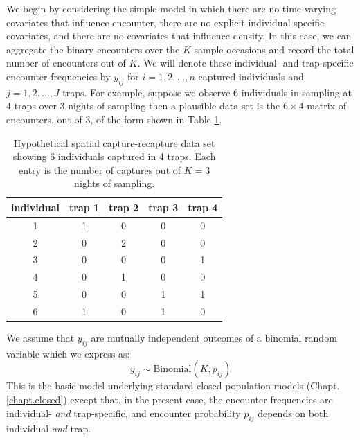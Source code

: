 We begin by considering the simple model in which there are
no time-varying covariates that influence encounter, there are no
explicit individual-specific covariates, and there are no covariates
that influence density. In this case, we can aggregate the binary
encounters over the $K$ sample occasions and record the total number
of encounters out of $K$. We will denote these individual- and
trap-specific encounter frequencies by $y_{ij}$ for $i=1,2,\ldots,n$
captured individuals and $j=1,2,\ldots,J$ traps.  For example, suppose
we observe 6 individuals in sampling at 4 traps over 3 nights of
sampling then a plausible data set is the $6 \times 4$ matrix of
encounters, out of 3, of the form shown in Table \ref{scr0.tab.data}.
\begin{table}
\centering
\caption{Hypothetical spatial capture-recapture data set showing 6
  individuals captured in 4 traps.
Each entry is the number of captures out of
 $K=3$ nights of sampling.
}
\begin{tabular}{ccccc}
\hline \hline
individual &  trap 1 & trap 2 & trap 3 & trap 4 \\ \hline 
1  &   1  &   0  &   0  &   0 \\
2  &   0  &   2  &   0  &   0 \\
3  &   0  &   0  &   0  &   1 \\
4  &   0  &   1  &   0  &   0 \\
5  &   0  &   0  &   1  &   1 \\
6  &   1  &   0  &   1  &   0 \\ \hline
\end{tabular}
\label{scr0.tab.data}
\end{table}
We assume that $y_{ij}$ are
 mutually independent outcomes of a binomial random variable which we
 express as:
\begin{equation}
	y_{ij} \sim \mbox{Binomial}(K, p_{ij})
\label{scr0.eq.bin}
\end{equation}
This is the basic model underlying standard closed population models
(Chapt. \ref{chapt.closed}) except that, in the present case, the
encounter frequencies are individual- {\it and} trap-specific, and encounter probability $p_{ij}$ depends on both individual {\it and}
trap.


